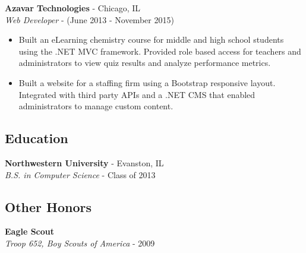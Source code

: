 \documentclass[12pt]{article}
\begin{document}
\begin{paracol}{2}
\noindent \textbf{Azavar Technologies} - Chicago, IL \\
\textit{Web Developer} - {\footnotesize(June 2013 - November 2015)}
\begin{itemize}
    \setlength\itemsep{0.1em}
    \item {\footnotesize{Built an eLearning chemistry course for middle and high school students using the .NET MVC framework. Provided role based access for teachers and administrators to view quiz results and analyze performance metrics.}} 
    \item {\footnotesize{Built a website for a staffing firm using a Bootstrap responsive layout. Integrated with third party APIs and a .NET CMS that enabled administrators to manage custom content.}}  
\end{itemize}

\subsection*{Education}
\textbf{Northwestern University} - Evanston, IL \\
\textit{B.S. in Computer Science} - {\footnotesize{Class of 2013}}

\subsection*{Other Honors}
\textbf{Eagle Scout} \\
\textit{Troop 652, Boy Scouts of America} - {\footnotesize{2009}}
    
\end{paracol}
\end{document}
